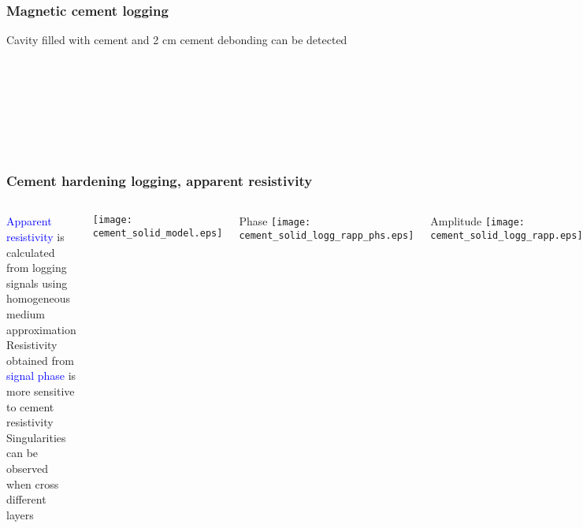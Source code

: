 \documentclass[aspectratio=169]{beamer}
\begin{document}
\begin{frame}
\frametitle{Magnetic cement logging}
Cavity filled with cement and 2 cm cement debonding can be detected 

\begin{minipage}[h]{0.21\linewidth}
 \\
\end{minipage}
\hfill
\begin{minipage}[h]{0.24\linewidth}
 \\
\end{minipage}
\hfill
\begin{minipage}[h]{0.21\linewidth}
 \\
\end{minipage}
\hfill
\begin{minipage}[h]{0.24\linewidth}
 \\
\end{minipage}

\end{frame}

\begin{frame}
\frametitle{Cement hardening logging, apparent resistivity}


\begin{columns}[c] 

\begin{small}

\textcolor{blue} {Apparent resistivity} is calculated from logging signals using homogeneous medium approximation\\
\vspace*{0.2cm}
Resistivity obtained from \textcolor{blue} {signal phase} is more sensitive to cement resistivity \\
\vspace*{0.2cm}
Singularities can be observed when cross different layers

\end{small}

\texttt{[image: cement\_solid\_model.eps]}

Phase
\texttt{[image: cement\_solid\_logg\_rapp\_phs.eps]}

Amplitude
\texttt{[image: cement\_solid\_logg\_rapp.eps]}

\end{columns}


\end{frame}
\end{document}
